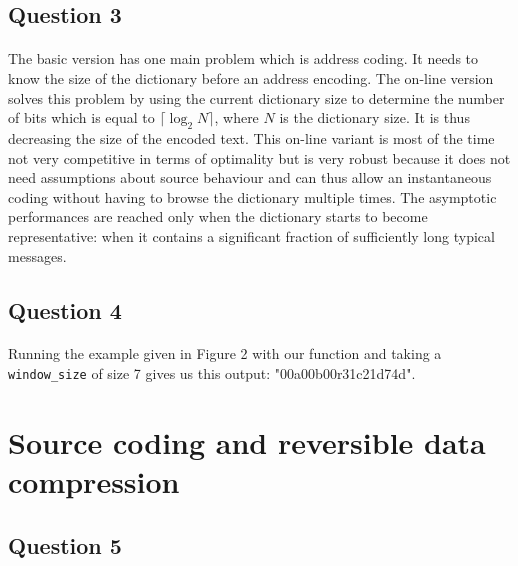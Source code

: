 \documentclass[a4paper, 11pt, oneside]{article}
\begin{document}
\subsection{Question 3}
\paragraph{}The basic version has one main problem which is address coding. It needs to know the
size of the dictionary before an address encoding. The on-line version solves this problem by using the current dictionary size to determine the number of bits which is equal to $\lceil\log_2{N}\rceil$, where $N$ is the dictionary size. It is thus decreasing the size of the encoded text. This on-line variant is most of the time not very competitive in
terms of optimality but is very robust because it does not need assumptions about source behaviour and can thus allow an instantaneous coding without having to browse the dictionary multiple times. The asymptotic performances are reached only when the dictionary starts to become
representative: when it contains a significant fraction of sufficiently long typical messages.

\subsection{Question 4}
\paragraph{}Running the example given in Figure 2 with our function and taking a \texttt{window\_size} of size 7 gives us this output: "00a00b00r31c21d74d". 

\section{Source coding and reversible data compression}

\subsection{Question 5}
\end{document}
